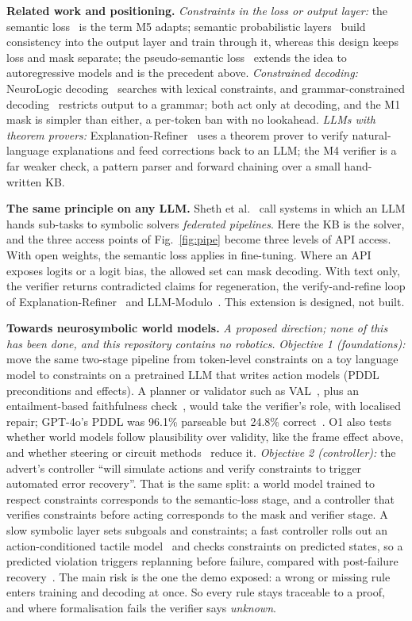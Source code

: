 \documentclass[letterpaper, 10pt, conference]{IEEEtran}
\begin{document}
\textbf{Related work and positioning.} \emph{Constraints in the loss or output layer:} the semantic loss~\cite{xu2018} is the term M5 adapts; semantic probabilistic layers~\cite{ahmed2022} build consistency into the output layer and train through it, whereas this design keeps loss and mask separate; the pseudo-semantic loss~\cite{ahmed2023} extends the idea to autoregressive models and is the precedent above. \emph{Constrained decoding:} NeuroLogic decoding~\cite{lu2021} searches with lexical constraints, and grammar-constrained decoding~\cite{geng2023} restricts output to a grammar; both act only at decoding, and the M1 mask is simpler than either, a per-token ban with no lookahead. \emph{LLMs with theorem provers:} Explanation-Refiner~\cite{quan2024} uses a theorem prover to verify natural-language explanations and feed corrections back to an LLM; the M4 verifier is a far weaker check, a pattern parser and forward chaining over a small hand-written KB.

\textbf{The same principle on any LLM.} Sheth et al.~\cite{sheth2023} call systems in which an LLM hands sub-tasks to symbolic solvers \emph{federated pipelines}. Here the KB is the solver, and the three access points of Fig.~\ref{fig:pipe} become three levels of API access. With open weights, the semantic loss applies in fine-tuning. Where an API exposes logits or a logit bias, the allowed set can mask decoding. With text only, the verifier returns contradicted claims for regeneration, the verify-and-refine loop of Explanation-Refiner~\cite{quan2024,quan2025} and LLM-Modulo~\cite{llmmodulo}. This extension is designed, not built.

\textbf{Towards neurosymbolic world models.} \emph{A proposed direction; none of this has been done, and this repository contains no robotics.} \emph{Objective 1 (foundations):} move the same two-stage pipeline from token-level constraints on a toy language model to constraints on a pretrained LLM that writes action models (PDDL preconditions and effects). A planner or validator such as VAL~\cite{val}, plus an entailment-based faithfulness check~\cite{quan2024,quan2025}, would take the verifier's role, with localised repair; GPT-4o's PDDL was 96.1\% parseable but 24.8\% correct~\cite{planetarium}. O1 also tests whether world models follow plausibility over validity, like the frame effect above, and whether steering or circuit methods~\cite{valentino2026,kim2025} reduce it. \emph{Objective 2 (controller):} the advert's controller ``will simulate actions and verify constraints to trigger automated error recovery''. That is the same split: a world model trained to respect constraints corresponds to the semantic-loss stage, and a controller that verifies constraints before acting corresponds to the mask and verifier stage. A slow symbolic layer sets subgoals and constraints; a fast controller rolls out an action-conditioned tactile model~\cite{mandil,nazari2022} and checks constraints on predicted states, so a predicted violation triggers replanning before failure, compared with post-failure recovery~\cite{reflect}. The main risk is the one the demo exposed: a wrong or missing rule enters training and decoding at once. So every rule stays traceable to a proof, and where formalisation fails the verifier says \emph{unknown}.
\end{document}

